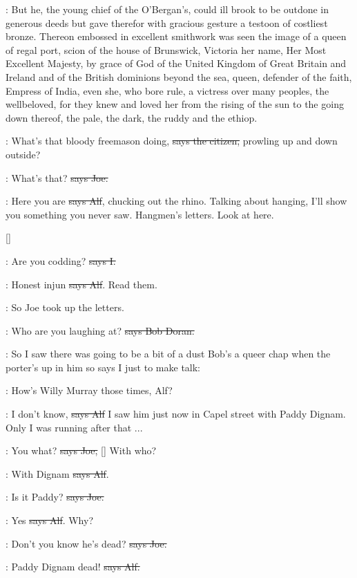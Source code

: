 :
But he, the young chief of the O'Bergan's,
could ill brook to be outdone
in generous deeds but gave therefor with gracious gesture a testoon
of costliest bronze. Thereon embossed in excellent smithwork was seen the
image of a queen of regal port, scion of the house of Brunswick, Victoria
her name, Her Most Excellent Majesty, by grace of God of the United
Kingdom of Great Britain and Ireland and of the British dominions beyond
the sea, queen, defender of the faith, Empress of India, even she, who
bore rule, a victress over many peoples, the wellbeloved, for they knew
and loved her from the rising of the sun to the going down thereof, the
pale, the dark, the ruddy and the ethiop.

\citizen:
What's that bloody freemason doing,
\sout{says the citizen,}
prowling up and down outside?

\joe:
What's that? \sout{says Joe.}

\bergan:
Here you are \sout{says Alf}, chucking out the rhino.
Talking about hanging,
I'll show you something you never saw. Hangmen's letters. Look at here.

[]

:
Are you codding? \sout{says I.}

\bergan:
Honest injun \sout{says Alf}. Read them.

\Nq:
So Joe took up the letters.

\doran:
Who are you laughing at?
\sout{says Bob Doran.}

\Nq:
So I saw there was going to be a bit of a dust Bob's a queer chap
when the porter's up in him so says I just to make talk:

:
How's Willy Murray those times, Alf?

\bergan:
I don't know, \sout{says Alf}
I saw him just now in Capel street with Paddy
Dignam. Only I was running after that ...

\joe:
You what?
\sout{says Joe,} []
With who?

\bergan:
With Dignam \sout{says Alf}.

\joe:
Is it Paddy? \sout{says Joe.}

\bergan:
Yes \sout{says Alf}. Why?

\joe:
Don't you know he's dead?
\sout{says Joe.}

\bergan:
Paddy Dignam dead! \sout{says Alf.}

